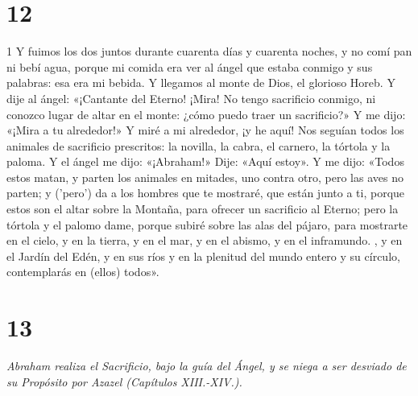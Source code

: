 \chapter{12}

\par 1 Y fuimos los dos juntos durante cuarenta días y cuarenta noches, y no comí pan ni bebí agua, porque mi comida era ver al ángel que estaba conmigo y sus palabras: esa era mi bebida. Y llegamos al monte de Dios, el glorioso Horeb. Y dije al ángel: «¡Cantante del Eterno! ¡Mira! No tengo sacrificio conmigo, ni conozco lugar de altar en el monte: ¿cómo puedo traer un sacrificio?» Y me dijo: «¡Mira a tu alrededor!» Y miré a mi alrededor, ¡y he aquí! Nos seguían todos los animales de sacrificio prescritos: la novilla, la cabra, el carnero, la tórtola y la paloma. Y el ángel me dijo: «¡Abraham!» Dije: «Aquí estoy». Y me dijo: «Todos estos matan, y parten los animales en mitades, uno contra otro, pero las aves no parten; y ('pero') da a los hombres que te mostraré, que están junto a ti, porque estos son el altar sobre la Montaña, para ofrecer un sacrificio al Eterno; pero la tórtola y el palomo dame, porque subiré sobre las alas del pájaro, para mostrarte en el cielo, y en la tierra, y en el mar, y en el abismo, y en el inframundo. , y en el Jardín del Edén, y en sus ríos y en la plenitud del mundo entero y su círculo, contemplarás en (ellos) todos».

\chapter{13}

\par \textit{Abraham realiza el Sacrificio, bajo la guía del Ángel, y se niega a ser desviado de su Propósito por Azazel (Capítulos XIII.-XIV.).}

